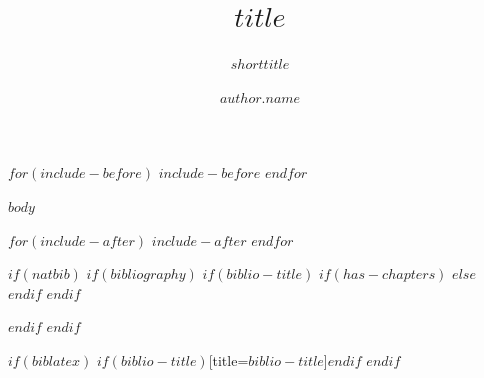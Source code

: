 \documentclass[sigconf]{acmart}
\title{$title$}
\subtitle{$shorttitle$}
\author{$author.name$}
\affiliation{
  \institution{$author.affiliation$}
  $if(author.country)$\country{$author.country$}$else$\country{Country}$endif$
}
\begin{document}
\maketitle

$for(include-before)$
$include-before$
$endfor$

$body$

$for(include-after)$
$include-after$
$endfor$

$if(natbib)$
$if(bibliography)$
$if(biblio-title)$
$if(has-chapters)$
\renewcommand\bibname{$biblio-title$}
$else$
\renewcommand\refname{$biblio-title$}
$endif$
$endif$
  
$endif$
$endif$

$if(biblatex)$
\printbibliography$if(biblio-title)$[title=$biblio-title$]$endif$
$endif$
\end{document}
